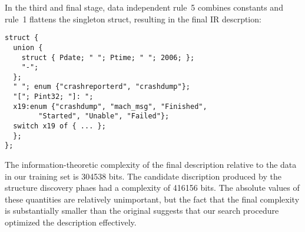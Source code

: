 

In the third and final stage, 
data independent rule~5 combines constants 
and rule~1 flattens the singleton struct, resulting in the final IR
descrption:

{\small
\begin{verbatim}
struct {
  union {
    struct { Pdate; " "; Ptime; " "; 2006; };
    "-";
  };
  " "; enum {"crashreporterd", "crashdump"};
  "["; Pint32; "]: ";
  x19:enum {"crashdump", "mach_msg", "Finished", 
        "Started", "Unable", "Failed"};
  switch x19 of { ... };
  };
};
\end{verbatim}
}

The information-theoretic complexity of the final description 
relative to the data in our training set is 304538 bits. 
The candidate discription produced by the structure discovery phaes
had a complexity of 416156 bits.  The absolute values of these quantities
are relatively unimportant, but the fact that the final complexity
is substantially smaller than the original suggests that our search
procedure optimized the description effectively.



